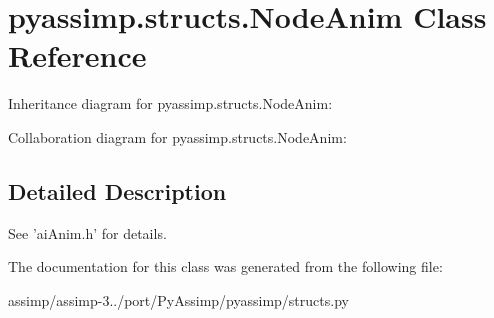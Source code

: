 \hypertarget{classpyassimp_1_1structs_1_1_node_anim}{\section{pyassimp.\+structs.\+Node\+Anim Class Reference}
\label{classpyassimp_1_1structs_1_1_node_anim}
}


Inheritance diagram for pyassimp.\+structs.\+Node\+Anim\+:


Collaboration diagram for pyassimp.\+structs.\+Node\+Anim\+:


\subsection{Detailed Description}
\begin{DoxyVerb}See 'aiAnim.h' for details.
\end{DoxyVerb}
 

The documentation for this class was generated from the following file\+:\begin{DoxyCompactItemize}
\item 
assimp/assimp-\/3../port/\+Py\+Assimp/pyassimp/structs.\+py\end{DoxyCompactItemize}
